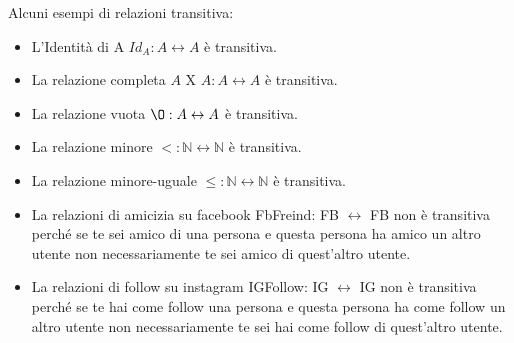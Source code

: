 \newpage
\begin{example}
Alcuni esempi di relazioni transitiva:
    \begin{itemize}
        \item L'Identità di A $Id_A: A \leftrightarrow A$ è transitiva.
        \item La relazione completa $A$ X $A:A \leftrightarrow A$ è transitiva.
        \item La relazione vuota $\O: A \leftrightarrow A$ è transitiva.
        \item La relazione minore $<: \mathbb{N} \leftrightarrow \mathbb{N}$ è transitiva.
        \item La relazione minore-uguale $\leq: \mathbb{N} \leftrightarrow \mathbb{N}$ è transitiva.
        \item La relazioni di amicizia su facebook FbFreind: FB $\leftrightarrow$ FB non è transitiva perché se te sei amico di una persona e questa persona ha amico un altro utente non necessariamente te sei amico di quest'altro utente.
        \item La relazioni di follow su instagram IGFollow: IG $\leftrightarrow$ IG non è transitiva perché se te hai come follow una persona e questa persona ha come follow un altro utente non necessariamente te sei hai come follow di quest'altro utente.
    \end{itemize}
\end{example}

